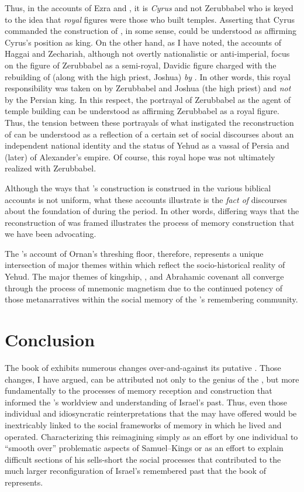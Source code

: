 Thus, in the accounts of Ezra and \chronicler, it is \emph{Cyrus} and not Zerubbabel who is keyed to the idea that \emph{royal} figures were those who built temples. Asserting that Cyrus commanded the construction of \thetemple, in some sense, could be understood as affirming Cyrus's position as king. On the other hand, as I have noted, the accounts of Haggai and Zechariah, although not overtly nationalistic or anti-imperial, focus on the figure of Zerubbabel as a semi-royal, Davidic figure charged with the rebuilding of \thetemple (along with the high priest, Joshua) \emph{by \yahweh}. In other words, this royal responsibility was taken on by Zerubbabel and Joshua (the high priest) and \emph{not} by the Persian king. In this respect, the portrayal of Zerubbabel as the agent of temple building can be understood as affirming Zerubbabel as a royal figure. Thus, the tension between these portrayals of what instigated the reconstruction of \thetemple can be understood as a reflection of a certain set of social discourses about an independent national identity and the status of Yehud as a vassal of Persia and (later) of Alexander's empire. Of course, this royal hope was not ultimately realized with Zerubbabel.

Although the ways that \thetemple's construction is construed in the various biblical accounts is not uniform, what these accounts illustrate is the \emph{fact of} discourses about the foundation of \thetemple during the \secondtemple period. In other words, differing ways that the reconstruction of \thetemple was framed illustrates the process of memory construction that we have been advocating.

The \chronicler's account of Ornan's threshing floor, therefore, represents a unique intersection of major themes within \chronicles which reflect the socio-historical reality of \secondtemple Yehud. The major themes of kingship, \thetemple, and Abrahamic covenant all converge through the process of mnemonic magnetism due to the continued potency of those metanarratives within the social memory of the \chronicler's remembering community.

\section{Conclusion}

The book of \chronicles exhibits numerous changes over-and-against its putative \vorlage. Those changes, I have argued, can be attributed not only to the genius of the \chronicler, but more fundamentally to the processes of memory reception and construction that informed the \chronicler's worldview and understanding of Israel's past. Thus, even those individual and idiosyncratic reinterpretations that the \chronicler may have offered would be inextricably linked to the social frameworks of memory in which he lived and operated. Characterizing this reimagining simply as an effort by one individual to ``smooth over'' problematic aspects of Samuel--Kings or as an effort to explain difficult sections of his \vorlage sells-short the social processes that contributed to the much larger reconfiguration of Israel's remembered past that the book of \chronicles represents.

